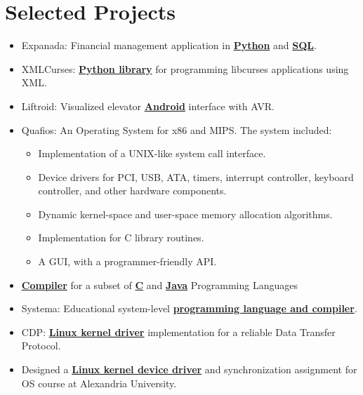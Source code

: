 \documentclass[letterpaper]{twentysecondcv} %
\begin{document}

\section{Selected Projects}

\begin{itemize}
    \item{Expanada: Financial management application in \textbf{\underline{Python}} and \textbf{\underline{SQL}}.}
    \item{XMLCurses: \textbf{\underline{Python library}} for programming libcurses applications using XML.}
    \item{Liftroid: Visualized elevator \textbf{\underline{Android}} interface with AVR.}
    \item{Quafios: An Operating System for x86 and MIPS. The system included:
          \begin{itemize}
            \item Implementation of a UNIX-like system call interface.
            \item Device drivers for PCI, USB, ATA, timers, interrupt controller, 
                  keyboard controller, and other hardware components.
            \item Dynamic kernel-space and user-space memory allocation algorithms.
            \item Implementation for C library routines.
            \item A GUI, with a programmer-friendly API.
          \end{itemize}
          }
    \item{\textbf{\underline{Compiler}} for a subset of \textbf{\underline{C}} and 
          \textbf{\underline{Java}} Programming Languages}
    \item{Systema: Educational system-level \textbf{\underline{programming language and compiler}}.}
    \item{CDP: \textbf{\underline{Linux kernel driver}} implementation for a reliable Data Transfer Protocol.}
    \item{Designed a \textbf{\underline{Linux kernel device driver}} and synchronization assignment 
          for OS course at Alexandria University.}

\end{itemize}
\end{document}
